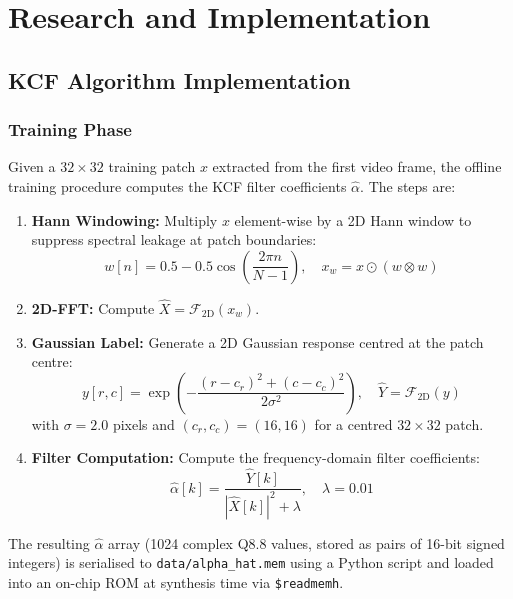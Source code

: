 \documentclass[a4paper,12pt]{report}
\begin{document}
\chapter{Research and Implementation}

\section{KCF Algorithm Implementation}

\subsection{Training Phase}

Given a $32 \times 32$ training patch $x$ extracted from the first video frame, the offline training procedure computes the KCF filter coefficients $\hat{\alpha}$. The steps are:

\begin{enumerate}
    \item \textbf{Hann Windowing:} Multiply $x$ element-wise by a 2D Hann window to suppress spectral leakage at patch boundaries:
    \begin{equation}
    w[n] = 0.5 - 0.5\cos\!\left(\frac{2\pi n}{N-1}\right), \quad x_w = x \odot (w \otimes w)
    \end{equation}
    \item \textbf{2D-FFT:} Compute $\hat{X} = \mathcal{F}_\text{2D}(x_w)$.
    \item \textbf{Gaussian Label:} Generate a 2D Gaussian response centred at the patch centre:
    \begin{equation}
    y[r,c] = \exp\!\left(-\frac{(r - c_r)^2 + (c - c_c)^2}{2\sigma^2}\right), \quad \hat{Y} = \mathcal{F}_\text{2D}(y)
    \end{equation}
    with $\sigma = 2.0$ pixels and $(c_r, c_c) = (16, 16)$ for a centred $32\times32$ patch.
    \item \textbf{Filter Computation:} Compute the frequency-domain filter coefficients:
    \begin{equation}\label{eq:alpha}
    \hat{\alpha}[k] = \frac{\hat{Y}[k]}{|\hat{X}[k]|^2 + \lambda}, \quad \lambda = 0.01
    \end{equation}
\end{enumerate}

The resulting $\hat{\alpha}$ array (1024 complex Q8.8 values, stored as pairs of 16-bit signed integers) is serialised to \texttt{data/alpha\_hat.mem} using a Python script and loaded into an on-chip ROM at synthesis time via \texttt{\$readmemh}.
\end{document}
